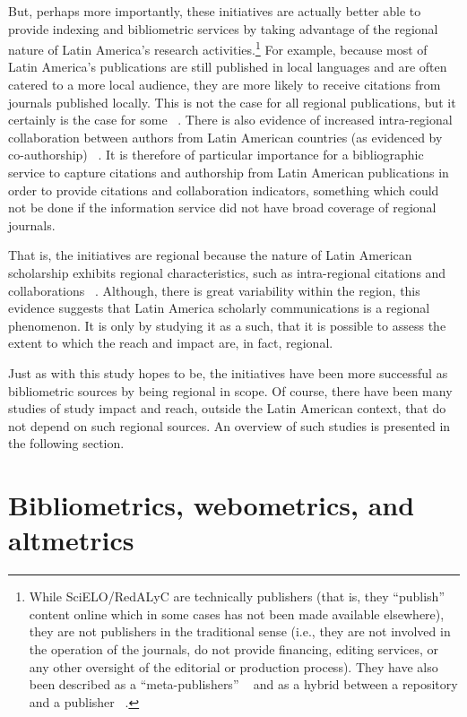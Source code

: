But, perhaps more importantly, these initiatives are actually better able to provide indexing and bibliometric services by taking advantage of the regional nature of Latin America's research activities.\footnote{While SciELO\slash RedALyC are technically publishers (that is, they ``publish'' content online which in some cases has not been made available elsewhere), they are not publishers in the traditional sense (i.e., they are not involved in the operation of the journals, do not provide financing, editing services, or any other oversight of the editorial or production process). They have also been described as a ``meta-publishers'' ~\citep{Packer2007} and as a hybrid between a repository and a publisher ~\citep{Guedon2008}.} For example, because most of Latin America's publications are still published in local languages and are often catered to a more local audience, they are more likely to receive citations from journals published locally. This is not the case for all regional publications, but it certainly is the case for some ~\citep{Meneghini2006,Collazo-Reyes2008,Collazo-Reyes2013}. There is also evidence of increased intra-regional collaboration between authors from Latin American countries (as evidenced by co-authorship) ~\citep{Lemarchand2011}. It is therefore of particular importance for a bibliographic service to capture citations and authorship from Latin American publications in order to provide citations and collaboration indicators, something which could not be done if the information service did not have broad coverage of regional journals.

That is, the initiatives are regional because the nature of Latin American scholarship exhibits regional characteristics, such as intra-regional citations and collaborations ~\citep{Meneghini2006,Collazo-Reyes2008,Collazo-Reyes2013,Lemarchand2011}. Although, there is great variability within the region, this evidence suggests that Latin America scholarly communications is a regional phenomenon. It is only by studying it as a such, that it is possible to assess the extent to which the reach and impact are, in fact, regional.

Just as with this study hopes to be, the initiatives have been more successful as bibliometric sources by being regional in scope. Of course, there have been many studies of study impact and reach, outside the Latin American context, that do not depend on such regional sources. An overview of such studies is presented in the following section.

\section{Bibliometrics, webometrics, and altmetrics}
\label{bibliometricswebometricsandaltmetrics}

